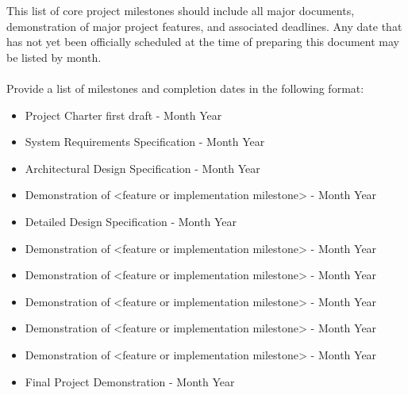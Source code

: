 This list of core project milestones should include all major documents, demonstration of major project features, and associated deadlines. Any date that has not yet been officially scheduled at the time of preparing this document may be listed by month.
\\
\\
Provide a list of milestones and completion dates in the following format:
\begin{itemize}
  \item Project Charter first draft - Month Year
  \item System Requirements Specification - Month Year
  \item Architectural Design Specification - Month Year
  \item Demonstration of <feature or implementation milestone> - Month Year
  \item Detailed Design Specification - Month Year
  \item Demonstration of <feature or implementation milestone> - Month Year
  \item Demonstration of <feature or implementation milestone> - Month Year
  \item Demonstration of <feature or implementation milestone> - Month Year
  \item Demonstration of <feature or implementation milestone> - Month Year
  \item Demonstration of <feature or implementation milestone> - Month Year
  \item Final Project Demonstration - Month Year
\end{itemize}